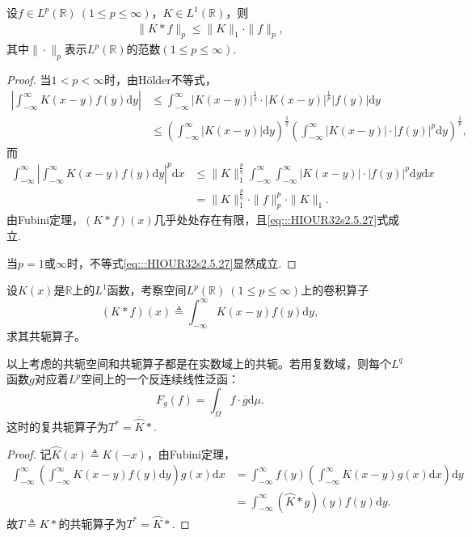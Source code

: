 \documentclass[../../main.tex]{subfiles}%
\begin{document}
\begin{lemma}[Young不等式]
设$f\in L^p(\mathbb{R})\ (1\leqslant p\leqslant\infty)$，$K\in L^1(\mathbb{R})$，则
\begin{align}
\|K*f\|_p\leqslant\|K\|_1\cdot\|f\|_p, \label{eq:::HIOUR32s2.5.27}
\end{align}
其中$\|\cdot\|_p$表示$L^p(\mathbb{R})$的范数$(1\leqslant p\leqslant\infty)$.
\end{lemma}
\begin{proof}

当$1<p<\infty$时，由Hölder不等式，
\begin{align*}
\left|\int_{-\infty}^{\infty}K(x-y)f(y)\mathrm{d}y\right|&\leqslant\int_{-\infty}^{\infty}|K(x-y)|^{\frac{1}{q}}\cdot|K(x-y)|^{\frac{1}{p}}|f(y)|\mathrm{d}y\\
&\leqslant\left(\int_{-\infty}^{\infty}|K(x-y)|\mathrm{d}y\right)^{\frac{1}{q}}\left(\int_{-\infty}^{\infty}|K(x-y)|\cdot|f(y)|^p\mathrm{d}y\right)^{\frac{1}{p}},
\end{align*}
而
\begin{align*}
\int_{-\infty}^{\infty}\left|\int_{-\infty}^{\infty}K(x-y)f(y)\mathrm{d}y\right|^p\mathrm{d}x&\leqslant\|K\|_1^{\frac{p}{q}}\int_{-\infty}^{\infty}\int_{-\infty}^{\infty}|K(x-y)|\cdot|f(y)|^p\mathrm{d}y\mathrm{d}x\\
&=\|K\|_1^{\frac{p}{q}}\cdot\|f\|_p^p\cdot\|K\|_1.
\end{align*}
由Fubini定理，$(K*f)(x)$几乎处处存在有限，且\eqref{eq:::HIOUR32s2.5.27}式成立.

当$p=1$或$\infty$时，不等式\eqref{eq:::HIOUR32s2.5.27}显然成立.

\end{proof}

\begin{example}
设$K(x)$是$\mathbb{R}$上的$L^1$函数，考察空间$L^p(\mathbb{R})\ (1\leqslant p\leqslant\infty)$上的卷积算子
\[
(K*f)(x)\triangleq\int_{-\infty}^{\infty}K(x-y)f(y)\mathrm{d}y,
\]
求其共轭算子。
\end{example}
\begin{remark}
以上考虑的共轭空间和共轭算子都是在实数域上的共轭。若用复数域，则每个$L^q$函数$g$对应着$L^p$空间上的一个反连续线性泛函：
\[
F_g(f)=\int_{\Omega}f\cdot\overline{g}\mathrm{d}\mu.
\]
这时的复共轭算子为$T^*=\overline{\wideparen{K}}*$.
\end{remark}
\begin{proof}

记$\wideparen{K}(x)\triangleq K(-x)$，由Fubini定理，
\begin{align*}
\int_{-\infty}^{\infty}\left(\int_{-\infty}^{\infty}K(x-y)f(y)\mathrm{d}y\right)g(x)\mathrm{d}x&=\int_{-\infty}^{\infty}f(y)\left(\int_{-\infty}^{\infty}K(x-y)g(x)\mathrm{d}x\right)\mathrm{d}y\\
&=\int_{-\infty}^{\infty}(\wideparen{K}*g)(y)f(y)\mathrm{d}y.
\end{align*}
故$T\triangleq K*$的共轭算子为$T^*=\wideparen{K}*$.

\end{proof}
\end{document}
